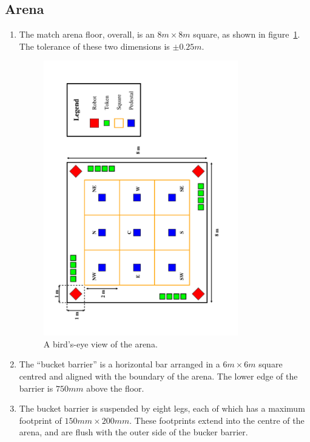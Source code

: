 \subsection{Arena}
\label{sub:arena}
\begin{enumerate}
\item The match arena floor, overall, is an $8m \times 8m$ square, as shown in figure~\ref{fig:arena-dim}.  The tolerance of these two dimensions is $\pm0.25m$.

\begin{figure}
  \centering
  \includegraphics[width=0.8\textwidth]{./images/arena.pdf}
  \caption{\label{fig:arena-dim}A bird's-eye view of the arena.}
\end{figure}

\item The ``bucket barrier'' is a horizontal bar arranged in a $6m \times 6m$ square centred and aligned with the boundary of the arena.  The lower edge of the barrier is $750mm$ above the floor.

\item The bucket barrier is suspended by eight legs, each of which has a maximum footprint of $150mm \times 200mm$.  These footprints extend into the centre of the arena, and are flush with the outer side of the bucker barrier.


\end{enumerate}
